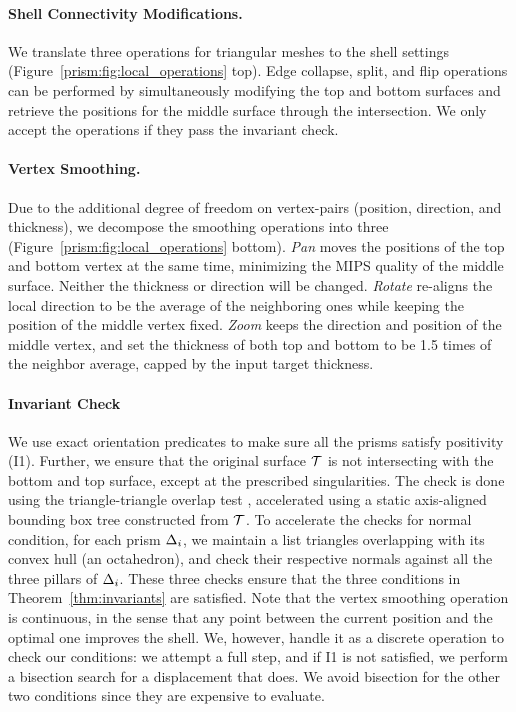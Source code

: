 \paragraph{Shell Connectivity Modifications.} We translate three operations for triangular meshes to the shell settings (Figure~\ref{prism:fig:local_operations} top). Edge collapse, split, and flip operations can be performed by simultaneously modifying the top and bottom surfaces
and retrieve the positions for the middle surface through the intersection. We only accept the operations if they pass the invariant check.

\paragraph{Vertex Smoothing.} Due to the additional degree of freedom on vertex-pairs (position, direction, and thickness), we decompose the smoothing operations into three  (Figure~\ref{prism:fig:local_operations} bottom). 
\emph{Pan} moves the positions of the top and bottom vertex at the same time, 
minimizing the MIPS quality of the middle surface. Neither the thickness or direction will be changed. 
\emph{Rotate} re-aligns the local direction to be the average of the neighboring ones while keeping the position of the middle vertex fixed. 
\emph{Zoom} keeps the direction and position of the middle vertex, and set the thickness of both top and bottom to be 1.5 times of the neighbor average, capped by the input target thickness.


\paragraph{Invariant Check}
We use exact orientation predicates \cite{shewchuk1997adaptive} to make sure all the prisms satisfy positivity (I1). Further, we ensure that the original surface $\mathcal{T}$ is not intersecting with the bottom and top surface, except at the prescribed singularities.
The check is done using the triangle-triangle overlap test \cite{guigue2003fast}, accelerated using a static axis-aligned bounding box tree constructed from $\mathcal{T}$. 
To accelerate the checks for normal condition, 
for each prism $\Delta_i$, 
we maintain a list triangles overlapping with its convex hull (an octahedron), 
and check their respective normals against all the three pillars of $\Delta_i$. These three checks ensure that the three conditions in  Theorem~\ref{thm:invariants} are satisfied.
%
Note that the vertex smoothing operation is continuous, in the sense that any point between the current position and the optimal one improves the shell. 
We, however, handle it as a discrete operation to check our conditions: we attempt a full step, and if I1 is not satisfied, we perform a bisection search for a displacement that does. We avoid bisection for the other two conditions since they are expensive to evaluate.

